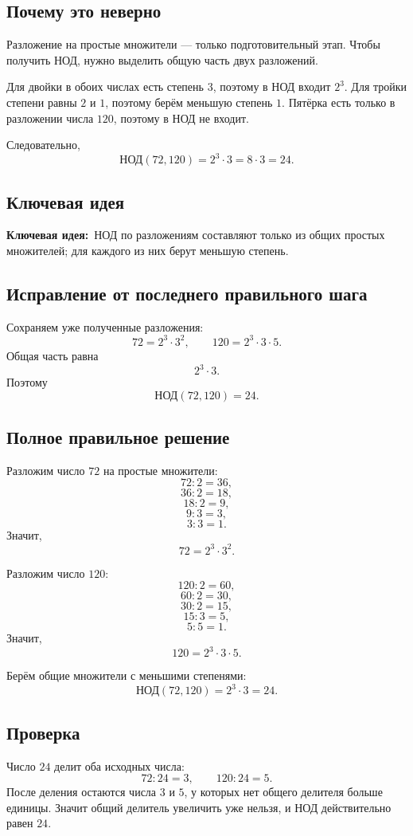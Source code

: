 \documentclass[a4paper,12pt]{article}
\newcommand{\KeyIdea}{\textcolor{Accent}{\textbf{Ключевая идея:}}}
\begin{document}
\subsection*{Почему это неверно}
Разложение на простые множители --- только подготовительный этап. Чтобы получить НОД, нужно выделить общую часть двух разложений.

Для двойки в обоих числах есть степень $3$, поэтому в НОД входит $2^3$. Для тройки степени равны $2$ и $1$, поэтому берём меньшую степень $1$. Пятёрка есть только в разложении числа $120$, поэтому в НОД не входит.

Следовательно,
\[
\text{НОД}(72,120)=2^3\cdot3=8\cdot3=24.
\]

\subsection*{Ключевая идея}
\KeyIdea\ НОД по разложениям составляют только из общих простых множителей; для каждого из них берут меньшую степень.

\subsection*{Исправление от последнего правильного шага}
Сохраняем уже полученные разложения:
\[
72=2^3\cdot3^2,
\qquad
120=2^3\cdot3\cdot5.
\]
Общая часть равна
\[
2^3\cdot3.
\]
Поэтому
\[
\text{НОД}(72,120)=24.
\]

\subsection*{Полное правильное решение}
Разложим число $72$ на простые множители:
\[
72:2=36,
\]
\[
36:2=18,
\]
\[
18:2=9,
\]
\[
9:3=3,
\]
\[
3:3=1.
\]
Значит,
\[
72=2^3\cdot3^2.
\]

Разложим число $120$:
\[
120:2=60,
\]
\[
60:2=30,
\]
\[
30:2=15,
\]
\[
15:3=5,
\]
\[
5:5=1.
\]
Значит,
\[
120=2^3\cdot3\cdot5.
\]

Берём общие множители с меньшими степенями:
\[
\text{НОД}(72,120)=2^3\cdot3=24.
\]

\subsection*{Проверка}
Число $24$ делит оба исходных числа:
\[
72:24=3,
\qquad
120:24=5.
\]
После деления остаются числа $3$ и $5$, у которых нет общего делителя больше единицы. Значит общий делитель увеличить уже нельзя, и НОД действительно равен $24$.
\end{document}
